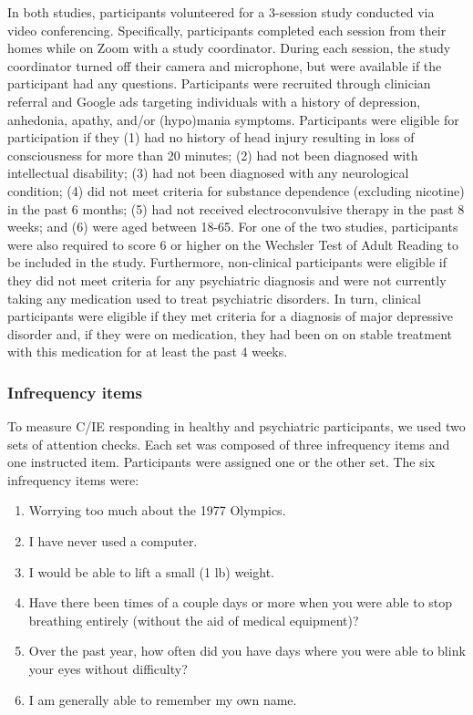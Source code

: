 \documentclass[a4paper,notitlepage,12pt]{article}
\begin{document}
\begin{refsection}[supp]
In both studies, participants volunteered for a 3-session study conducted via video conferencing. Specifically, participants completed each session from their homes while on Zoom with a study coordinator. During each session, the study coordinator turned off their camera and microphone, but were available if the participant had any questions. Participants were recruited through clinician referral and Google ads targeting individuals with a history of depression, anhedonia, apathy, and/or (hypo)mania symptoms. Participants were eligible for participation if they (1) had no history of head injury resulting in loss of consciousness for more than 20 minutes; (2) had not been diagnosed with intellectual disability; (3) had not been diagnosed with any neurological condition; (4) did not meet criteria for substance dependence (excluding nicotine) in the past 6 months; (5) had not received electroconvulsive therapy in the past 8 weeks; and (6) were aged between 18-65. For one of the two studies, participants were also required to score 6 or higher on the Wechsler Test of Adult Reading to be included in the study. Furthermore, non-clinical participants were eligible if they did not meet criteria for any psychiatric diagnosis and were not currently taking any medication used to treat psychiatric disorders. In turn, clinical participants were eligible if they met criteria for a diagnosis of major depressive disorder and, if they were on medication, they had been on on stable treatment with this medication for at least the past 4 weeks. 

\subsubsection*{Infrequency items}

To measure C/IE responding in healthy and psychiatric participants, we used two sets of attention checks. Each set was composed of three infrequency items and one instructed item. Participants were assigned one or the other set. The six infrequency items were:

\begin{enumerate}
    \item Worrying too much about the 1977 Olympics.
    \item I have never used a computer.
    \item I would be able to lift a small (1 lb) weight.
    \item Have there been times of a couple days or more when you were able to stop breathing entirely (without the aid of medical equipment)?
    \item Over the past year, how often did you have days where you were able to blink your eyes without difficulty?
    \item I am generally able to remember my own name.
\end{enumerate}


\end{refsection}
\end{document}

